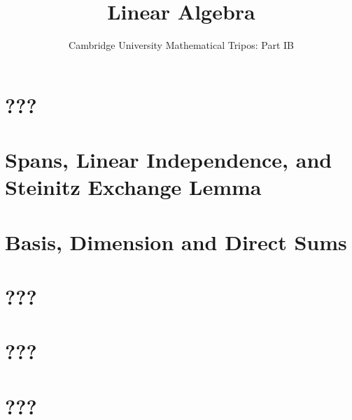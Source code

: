 \documentclass{article}
\title{Linear Algebra}
\author{Cambridge University Mathematical Tripos: Part IB}
\begin{document}
\maketitle

\tableofcontentsnewpage{}

\section{???}

\section{Spans, Linear Independence, and Steinitz Exchange Lemma}

\section{Basis, Dimension and Direct Sums}

\section{???}

\section{???}

\section{???}

\end{document}
